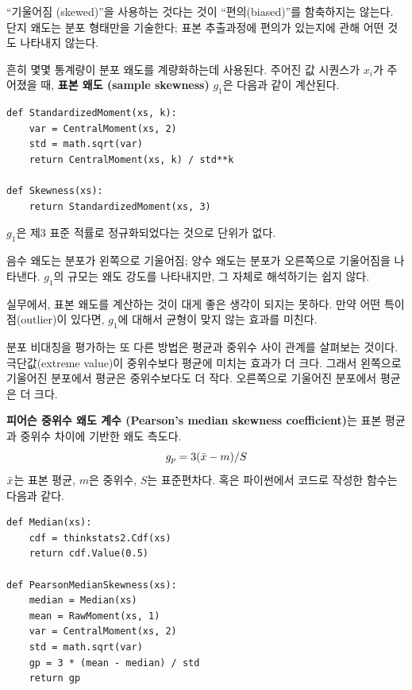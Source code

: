
``기울어짐 (skewed)''을 사용하는 것다는 것이 ``편의(biased)''를 함축하지는 않는다.
단지 왜도는 분포 형태만을 기술한다; 표본 추출과정에 편의가 있는지에 관해 
어떤 것도 나타내지 않는다.


흔히 몇몇 통계량이 분포 왜도를 계량화하는데 사용된다.
주어진 값 시퀀스가 $x_i$가 주어졌을 때, 
{\bf 표본 왜도 (sample skewness)} $g_1$은 다음과 같이 계산된다.

\begin{verbatim}
def StandardizedMoment(xs, k):
    var = CentralMoment(xs, 2)
    std = math.sqrt(var)
    return CentralMoment(xs, k) / std**k

def Skewness(xs):
    return StandardizedMoment(xs, 3)
\end{verbatim}

$g_1$은 제3 표준 적률로 정규화되었다는 것으로 단위가 없다.

음수 왜도는 분포가 왼쪽으로 기울어짐; 양수 왜도는 분포가 오른쪽으로 기울어짐을 
나타낸다. $g_1$의 규모는 왜도 강도를 나타내지만, 그 자체로 해석하기는 쉽지 않다.

실무에서, 표본 왜도를 계산하는 것이 대게 좋은 생각이 되지는 못하다.
만약 어떤 특이점(outlier)이 있다면, $g_1$에 대해서 균형이 맞지 않는 효과를 미친다.

분포 비대칭을 평가하는 또 다른 방법은 평균과 중위수 사이 관계를 살펴보는 것이다.
극단값(extreme value)이 중위수보다 평균에 미치는 효과가 더 크다. 그래서 왼쪽으로 기울어진
분포에서 평균은 중위수보다도 더 작다. 오른쪽으로 기울어진 분포에서 평균은 더 크다.




{\bf 피어슨 중위수 왜도 계수 (Pearson's median skewness coefficient)}는
 표본 평균과 중위수 차이에 기반한 왜도 측도다.
%
\[ g_p = 3 (\bar{x} - m) / S \]
%
$\bar{x}$는 표본 평균, $m$은 중위수, $S$는 표준편차다.
혹은 파이썬에서 코드로 작성한 함수는 다음과 같다.

\begin{verbatim}
def Median(xs):
    cdf = thinkstats2.Cdf(xs)
    return cdf.Value(0.5)

def PearsonMedianSkewness(xs):
    median = Median(xs)
    mean = RawMoment(xs, 1)
    var = CentralMoment(xs, 2)
    std = math.sqrt(var)
    gp = 3 * (mean - median) / std
    return gp
\end{verbatim}

